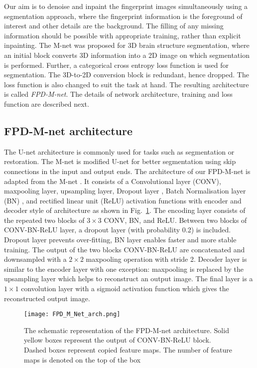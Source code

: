 \documentclass{llncs}
\begin{document}
Our aim is to denoise and inpaint the fingerprint images simultaneously using a segmentation approach, where the fingerprint information is the foreground of interest and other details are the background. The filling of any missing information should be possible with appropriate training, rather than explicit inpainting. The M-net was proposed for 3D brain structure segmentation, where an initial block converts 3D information into a 2D image on which segmentation is performed.  Further, a categorical cross entropy loss function is used for segmentation. The 3D-to-2D conversion block is redundant, hence dropped. The loss function is also changed to suit the task at hand. The resulting architecture is called \textit{FPD-M-net}. The details of network architecture, training and loss function are described next.

\subsection{FPD-M-net architecture}
\label{ssec:arch}
The U-net \cite{ronneberger2015u} architecture is commonly used for tasks such as segmentation or restoration. The M-net is modified U-net for better segmentation using skip connections in the input and output ends. The architecture of our FPD-M-net is adapted from the M-net \cite{mehta2017m}. It consists of a Convolutional layer (CONV), maxpooling layer, upsampling layer, Dropout layer \cite{srivastava2014dropout}, Batch Normalisation layer (BN) \cite{ioffe2015batch}, and rectified linear unit (ReLU) activation functions with encoder and decoder style of architecture as shown in Fig.~\ref{fig:FPD-M-net}. The encoding layer consists of the repeated two blocks of $3 \times 3$ CONV, BN, and ReLU. Between two blocks of CONV-BN-ReLU layer, a dropout layer (with probability 0.2) is included. Dropout layer prevents over-fitting, BN layer enables faster and more stable training. The output of the two blocks CONV-BN-ReLU are concatenated and downsampled with a $2 \times 2$ maxpooling operation with stride 2. Decoder layer is similar to the encoder layer with one exception: maxpooling is replaced by the upsampling layer which helps to reconstruct an output image. The final layer is a $1 \times 1$ convolution layer with a sigmoid activation function which gives the reconstructed output image.

\begin{figure}[t]
    \centering
    \texttt{[image: FPD\_M\_Net\_arch.png]}
    \caption{The schematic representation of the FPD-M-net architecture. Solid yellow boxes represent the output of CONV-BN-ReLU block. Dashed boxes represent copied feature maps. The number of feature maps is denoted on the top of the box}
    \label{fig:FPD-M-net}
\end{figure}
\end{document}
